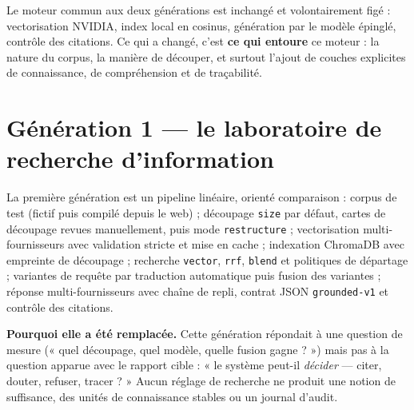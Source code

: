 \documentclass[a4paper,12pt]{report}
\begin{document}
Le moteur commun aux deux générations est inchangé et volontairement figé : vectorisation NVIDIA,
index local en cosinus, génération par le modèle épinglé, contrôle des citations. Ce qui a changé,
c'est \textbf{ce qui entoure} ce moteur : la nature du corpus, la manière de découper, et surtout
l'ajout de couches explicites de connaissance, de compréhension et de traçabilité.

\section{Génération 1 — le laboratoire de recherche d'information}
La première génération est un pipeline linéaire, orienté comparaison : corpus de test (fictif puis
compilé depuis le web) ; découpage \texttt{size} par défaut, cartes de découpage revues
manuellement, puis mode \texttt{restructure} ; vectorisation multi-fournisseurs avec validation
stricte et mise en cache ; indexation ChromaDB avec empreinte de découpage ; recherche
\texttt{vector}, \texttt{rrf}, \texttt{blend} et politiques de départage ; variantes de requête par
traduction automatique puis fusion des variantes ; réponse multi-fournisseurs avec chaîne de repli,
contrat JSON \texttt{grounded-v1} et contrôle des citations.

\textbf{Pourquoi elle a été remplacée.} Cette génération répondait à une question de mesure
(« quel découpage, quel modèle, quelle fusion gagne ? ») mais pas à la question apparue avec le
rapport cible : « le système peut-il \emph{décider} — citer, douter, refuser, tracer ? » Aucun
réglage de recherche ne produit une notion de suffisance, des unités de connaissance stables ou un
journal d'audit.
\end{document}
